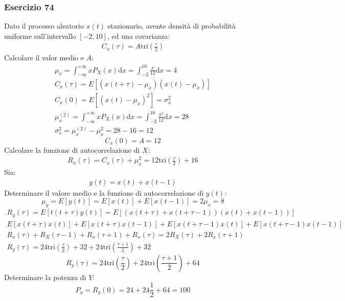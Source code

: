 \documentclass{article}
\newcommand{\df}{\mathrm{d}}
\begin{document}
\subsubsection*{Esercizio 74}

Dato il processo aleatorio $x(t)$ stazionario, avente densità di probabilità uniforme sull'intervallo $[-2,10]$, ed una covarianza:
\begin{gather*}
    C_x(\tau)=A\mathrm{tri}\displaystyle\left(\frac{\tau}{2}\right)
\end{gather*}
Calcolare il valor medio e $A$:
\begin{gather*}
    \mu_x=\displaystyle\int_{-\infty}^{+\infty}xP_X(x)\df x=\int_{-2}^{10}\frac{x}{12}\df x=4\\
    C_x(\tau)=E[(x(t+\tau)-\mu_x)(x(t)-\mu_x)]\\
    C_x(0)=E[(x(t)-\mu_x)^2]=\sigma_x^2\\
    \mu_x^{(2)}=\displaystyle\int_{-\infty}^{+\infty}xP_X(x)\df x=\int_{-2}^{10}\frac{x^2}{12}\df x=28\\
    \sigma_x^2=\mu_x^{(2)}-\mu_x^2=28-16=12
\end{gather*}
\begin{equation}
    C_x(0)=A=12
\end{equation}
Calcolare la funzione di autocorrelazione di $X$:
\begin{gather}
    R_x(\tau)=C_x(\tau)+\mu_x^2=12\mathrm{tri}\displaystyle\left(\frac{\tau}{2}\right)+16
\end{gather}
Sia: 
\begin{gather*}
    y(t)=x(t)+x(t-1)
\end{gather*}
Determinare il valore medio e la funzione di autocorrelazione di $y(t)$:
\begin{equation}
    \mu_y=E[y(t)]=E[x(t)]+E[x(t-1)]=2\mu_x=8
\end{equation}
\begin{gather*}
    R_y(\tau)=E[t(t+\tau)y(t)]=E[(x(t+\tau)+x(t+\tau-1))(x(t)+x(t-1))]\\
    E[x(t+\tau)x(t)]+E[x(t+\tau)x(t-1)]+E[x(t+\tau-1)x(t)]+E[x(t+\tau-1)x(t-1)]\\
    R_x(\tau)+R_X(\tau-1)+R_x(\tau+1)+R_x(\tau)=2R_X(\tau)+2R_x(\tau+1)\\
    R_y(\tau)=24\mathrm{tri}\displaystyle\left(\frac{\tau}{2}\right)+32+24\mathrm{tri}\left(\frac{\tau+1}{2}\right)+32
\end{gather*}
\begin{equation}
    R_y(\tau)=24\mathrm{tri}\displaystyle\left(\frac{\tau}{2}\right)+24\mathrm{tri}\left(\frac{\tau+1}{2}\right)+64
\end{equation}
Determinare la potenza di $Y$:
\begin{equation}
    P_y=R_y(0)=24+24\displaystyle\frac{1}{2}+64=100    
\end{equation}
\end{document}
